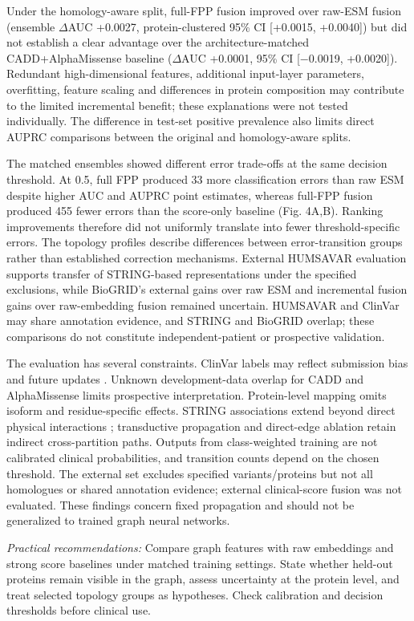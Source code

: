 \documentclass[conference]{IEEEtran}
\begin{document}
Under the homology-aware split, full-FPP fusion improved over raw-ESM fusion (ensemble $\Delta$AUC +0.0027, protein-clustered 95\% CI [+0.0015, +0.0040]) but did not establish a clear advantage over the architecture-matched CADD+AlphaMissense baseline ($\Delta$AUC +0.0001, 95\% CI [$-$0.0019, +0.0020]). Redundant high-dimensional features, additional input-layer parameters, overfitting, feature scaling and differences in protein composition may contribute to the limited incremental benefit; these explanations were not tested individually. The difference in test-set positive prevalence also limits direct AUPRC comparisons between the original and homology-aware splits.

The matched ensembles showed different error trade-offs at the same decision threshold. At 0.5, full FPP produced 33 more classification errors than raw ESM despite higher AUC and AUPRC point estimates, whereas full-FPP fusion produced 455 fewer errors than the score-only baseline (Fig. 4A,B). Ranking improvements therefore did not uniformly translate into fewer threshold-specific errors. The topology profiles describe differences between error-transition groups rather than established correction mechanisms. External HUMSAVAR evaluation supports transfer of STRING-based representations under the specified exclusions, while BioGRID's external gains over raw ESM and incremental fusion gains over raw-embedding fusion remained uncertain. HUMSAVAR and ClinVar may share annotation evidence, and STRING and BioGRID overlap; these comparisons do not constitute independent-patient or prospective validation.

The evaluation has several constraints. ClinVar labels may reflect submission bias and future updates \cite{Landrum2020ClinVar}. Unknown development-data overlap for CADD and AlphaMissense limits prospective interpretation. Protein-level mapping omits isoform and residue-specific effects. STRING associations extend beyond direct physical interactions \cite{Szklarczyk2023STRING}; transductive propagation and direct-edge ablation retain indirect cross-partition paths. Outputs from class-weighted training are not calibrated clinical probabilities, and transition counts depend on the chosen threshold. The external set excludes specified variants/proteins but not all homologues or shared annotation evidence; external clinical-score fusion was not evaluated. These findings concern fixed propagation and should not be generalized to trained graph neural networks.

\noindent\textit{Practical recommendations:}
Compare graph features with raw embeddings and strong score baselines under matched training settings. State whether held-out proteins remain visible in the graph, assess uncertainty at the protein level, and treat selected topology groups as hypotheses. Check calibration and decision thresholds before clinical use.
\end{document}
